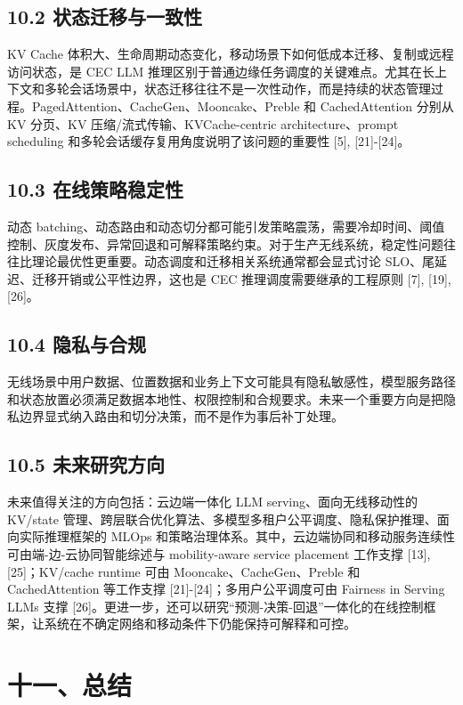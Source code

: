 \documentclass[a4paper,twocolumn,10pt]{ctexart}
\begin{document}
\subsection{10.2 状态迁移与一致性}

KV Cache 体积大、生命周期动态变化，移动场景下如何低成本迁移、复制或远程访问状态，是 CEC LLM 推理区别于普通边缘任务调度的关键难点。尤其在长上下文和多轮会话场景中，状态迁移往往不是一次性动作，而是持续的状态管理过程。PagedAttention、CacheGen、Mooncake、Preble 和 CachedAttention 分别从 KV 分页、KV 压缩/流式传输、KVCache-centric architecture、prompt scheduling 和多轮会话缓存复用角度说明了该问题的重要性 [5], [21]-[24]。


\subsection{10.3 在线策略稳定性}

动态 batching、动态路由和动态切分都可能引发策略震荡，需要冷却时间、阈值控制、灰度发布、异常回退和可解释策略约束。对于生产无线系统，稳定性问题往往比理论最优性更重要。动态调度和迁移相关系统通常都会显式讨论 SLO、尾延迟、迁移开销或公平性边界，这也是 CEC 推理调度需要继承的工程原则 [7], [19], [26]。


\subsection{10.4 隐私与合规}

无线场景中用户数据、位置数据和业务上下文可能具有隐私敏感性，模型服务路径和状态放置必须满足数据本地性、权限控制和合规要求。未来一个重要方向是把隐私边界显式纳入路由和切分决策，而不是作为事后补丁处理。


\subsection{10.5 未来研究方向}

未来值得关注的方向包括：云边端一体化 LLM serving、面向无线移动性的 KV/state 管理、跨层联合优化算法、多模型多租户公平调度、隐私保护推理、面向实际推理框架的 MLOps 和策略治理体系。其中，云边端协同和移动服务连续性可由端-边-云协同智能综述与 mobility-aware service placement 工作支撑 [13], [25]；KV/cache runtime 可由 Mooncake、CacheGen、Preble 和 CachedAttention 等工作支撑 [21]-[24]；多用户公平调度可由 Fairness in Serving LLMs 支撑 [26]。更进一步，还可以研究“预测-决策-回退”一体化的在线控制框架，让系统在不确定网络和移动条件下仍能保持可解释和可控。


\section{十一、总结}
\end{document}
